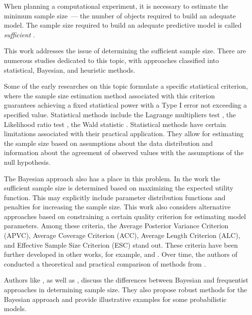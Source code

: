 \documentclass[sn-mathphys-num]{sn-jnl}%
\begin{document}
When planning a computational experiment, it is necessary to estimate the minimum sample size~--- the number of objects required to build an adequate model. The sample size required to build an adequate predictive model is called \textit{sufficient} \cite{byrd2012sample,figueroa2012predicting,balki2019sample}. 

This work addresses the issue of determining the sufficient sample size. There are numerous studies dedicated to this topic, with approaches classified into statistical, Bayesian, and heuristic methods.

Some of the early researches on this topic \cite{Adcock1988,Joseph1995} formulate a specific statistical criterion, where the sample size estimation method associated with this criterion guarantees achieving a fixed statistical power with a Type I error not exceeding a specified value. Statistical methods include the Lagrange multipliers test \cite{self1988power}, the Likelihood ratio test \cite{shieh2000power}, the Wald statistic \cite{shieh2005power}. Statistical methods have certain limitations associated with their practical application. They allow for estimating the sample size based on assumptions about the data distribution and information about the agreement of observed values with the assumptions of the null hypothesis.

The Bayesian approach also has a place in this problem. In the work \cite{Lindley1997} the sufficient sample size is determined based on maximizing the expected utility function. This may explicitly include parameter distribution functions and penalties for increasing the sample size. This work also considers alternative approaches based on constraining a certain quality criterion for estimating model parameters. Among these criteria, the Average Posterior Variance Criterion (APVC), Average Coverage Criterion (ACC), Average Length Criterion (ALC), and Effective Sample Size Criterion (ESC) stand out. These criteria have been further developed in other works, for example, \cite{PhamGia1997} and \cite{Gelfand2002}. Over time, the authors of \cite{Cao2009} conducted a theoretical and practical comparison of methods from \cite{Adcock1988,Joseph1995,Lindley1997}.

Authors like \cite{Brutti2014}, as well as \cite{Pezeshk2008}, discuss the differences between Bayesian and frequentist approaches in determining sample size. They also propose robust methods for the Bayesian approach and provide illustrative examples for some probabilistic models.
\end{document}
